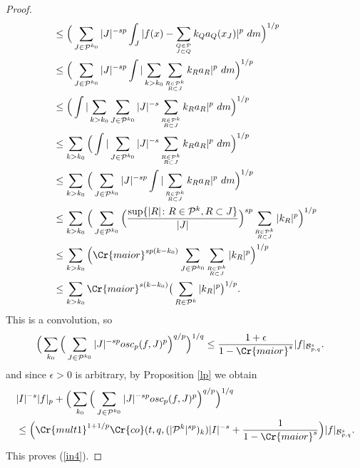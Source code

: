 \documentclass{amsart}
\theoremstyle{definition}
\newcommand{\Crr}[1]{\Cr{#1}}
\begin{document}
\begin{proof}
\begin{align}
&\leq   \Big(  \sum_{J\in \mathcal{P}^{k_0} }  |J|^{-sp} \int_J |f(x) -    \sum_{\substack{_{Q \in \mathcal{P}}\\ _{J \subset Q}}} k_Q a_Q(x_J)|^p \ dm   \Big)^{1/p} \nonumber \\
&\leq  \Big( \sum_{J\in \mathcal{P}^{k_0} }  |J|^{-sp} \int |\sum_{k> k_0}  \sum_{\substack{_{R \in \mathcal{P}^k}\\_{R  \subset J}}} k_R a_R |^p \ dm  \Big)^{1/p}  \nonumber \\
&\leq \Big( \int |  \sum_{k>  k_0}\sum_{J\in \mathcal{P}^{k_0} }    |J|^{-s}  \sum_{\substack{_{R \in \mathcal{P}^k}\\_{R  \subset J}}} k_R a_R |^p \ dm  \Big)^{1/p}  \nonumber \\
&\leq  \sum_{k>  k_0} \Big( \int | \sum_{J\in \mathcal{P}^{k_0} }    |J|^{-s}  \sum_{\substack{_{R \in \mathcal{P}^k}\\_{R  \subset J}}} k_R a_R |^p \ dm  \Big)^{1/p}  \nonumber \\
&\leq  \sum_{k> k_0} \Big(   \sum_{J\in \mathcal{P}^{k_0} }  |J|^{-sp}\int   |    \sum_{\substack{_{R \in \mathcal{P}^k}\\_{R  \subset J}}} k_R a_R |^p \ dm  \Big)^{1/p}  \nonumber \\
&\leq  \sum_{k> k_0} \Big(   \sum_{J\in \mathcal{P}^{k_0} } \Big( \frac{\sup \{ |R|\colon R \in \mathcal{P}^k, R  \subset J \}}{ |J|}\Big)^{sp}  \sum_{\substack{_{R \in \mathcal{P}^k}\\_{R  \subset J}}} |k_R|^p  \Big)^{1/p}  \nonumber \\
&\leq  \sum_{k> k_0} \Big(  \Crr{maior}^{sp(k-k_0)}   \sum_{J\in \mathcal{P}^{k_0} }  \sum_{\substack{_{R \in \mathcal{P}^k}\\_{R  \subset J}}} |k_R|^p  \Big)^{1/p}  \nonumber \\
&\leq  \sum_{k> k_0}  \Crr{maior}^{s(k-k_0)}  \big( \sum_{R \in \mathcal{P}^k} |k_R|^p  \big)^{1/p}.  \nonumber 
\end{align}
This is  a convolution, so 
\begin{align*} \Big( \sum_{k_0} \Big( \sum_{J\in \mathcal{P}^{k_0} } |J|^{-sp }  osc_p(f,J)^p \Big)^{q/p} \Big)^{1/q} &\leq \frac{1+\epsilon}{1-\Crr{maior}^s} |f|_{\mathcal{B}^s_{p,q}}.\end{align*}
and since $\epsilon > 0$ is arbitrary,  by Proposition \ref{lp} we obtain 
\begin{align*} &|I|^{-s}|f|_p + \Big( \sum_{k_0} \Big( \sum_{J\in \mathcal{P}^{k_0} } |J|^{-sp }  osc_p(f,J)^p  \Big)^{q/p} \Big)^{1/q} \\
&\leq \Big(\Crr{mult1}^{1+1/p}  \Crr{co}(t,q, ( |\mathcal{P}^k|^{sp} )_k )|I|^{-s}+\frac{1}{1-\Crr{maior}^s}\Big) |f|_{\mathcal{B}^s_{p,q}}.\end{align*}
This proves (\ref{in4}).
 \end{proof}
 
\end{document}
